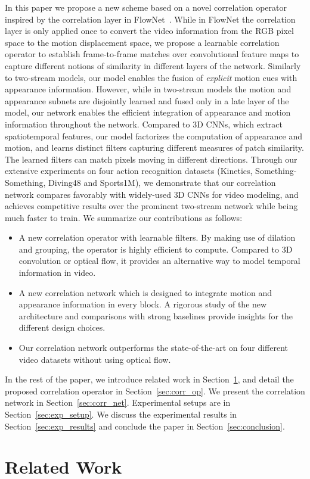 \documentclass[10pt,twocolumn,letterpaper]{article}
\newenvironment{myitemize}
{ \begin{itemize}  [leftmargin=*]
    \setlength{\itemsep}{0pt}
    \setlength{\parskip}{0pt}
    \setlength{\parsep}{0pt}}
{ \end{itemize} }
\begin{document}
In this paper we propose a new  scheme based on a novel correlation operator inspired by the correlation layer in FlowNet~\cite{FlowNet}. While in FlowNet the correlation layer is only applied once to convert the video information from the RGB pixel space to the motion displacement space, we propose a learnable correlation operator to establish frame-to-frame matches over convolutional feature maps to capture different notions of similarity in different layers of the network. Similarly to two-stream models, our model enables the fusion of {\em explicit} motion cues with appearance information. However, while in two-stream models the motion and appearance subnets are disjointly learned and fused only in a late layer of the model, our network enables the efficient integration of appearance and motion information throughout the network. Compared to 3D CNNs, which extract spatiotemporal features, our model factorizes the computation of appearance and motion, and learns distinct filters capturing different measures of patch similarity. The learned filters can match pixels moving in different directions.
Through our extensive experiments on four action recognition datasets (Kinetics, Something-Something, Diving48 and Sports1M), we demonstrate that our correlation network compares favorably with widely-used 3D CNNs for video modeling, and achieves competitive results over the prominent two-stream network while being much faster to train. We summarize our contributions as follows:
\begin{myitemize} 
\item A new correlation operator with learnable filters. By making use of dilation and grouping, the operator is highly efficient to compute. Compared to 3D convolution or optical flow, it provides an alternative way to model temporal information in video.
\item A new correlation network which is designed to integrate motion and appearance information in every block. A rigorous study of the new architecture and comparisons with strong baselines provide insights for the different design choices.
\item Our correlation network outperforms the state-of-the-art on four different video datasets without  using optical flow.
\end{myitemize}

In the rest of the paper, we introduce related work in Section~\ref{sec:related}, and detail the proposed correlation operator in Section~\ref{sec:corr_op}. We present the correlation network in Section~\ref{sec:corr_net}. Experimental setups are in Section~\ref{sec:exp_setup}. We discuss the experimental results in Section~\ref{sec:exp_results} and conclude the paper in Section~\ref{sec:conclusion}.  \section{Related Work}\label{sec:related}
\end{document}
